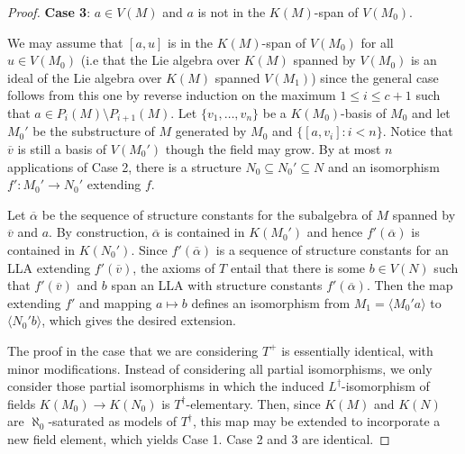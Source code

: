 \documentclass[10pt,a4paper]{amsart}
\newcommand{\set}[1]{\left\{ {#1} \right\}}
\begin{document}
\begin{proof}
\textbf{Case 3}:  $a \in V(M)$ and $a$ is not in the $K(M)$-span of $V(M_{0})$.

We may assume that $[a,u]$ is in the $K(M)$-span of $V(M_{0})$ for all $u \in V(M_{0})$ (i.e that the Lie algebra over $K(M)$ spanned by $V(M_{0})$ is an ideal of the Lie algebra over $K(M)$ spanned $V(M_{1})$) since the general case follows from this one by reverse induction on the maximum $1\leq i\leq c+1$ such that $a\in P_i(M)\setminus P_{i+1}(M)$. Let $\{v_1,\dots, v_n\}$ be a $K(M_0)$-basis of $M_0$ and let $M_{0}'$ be the substructure of $M$ generated by $M_{0}$ and $\{[a,v_{i}] : i < n\}$.  Notice that $\overline{v}$ is still a basis of $V(M_{0}')$ though the field may grow. 
 By at most $n$ applications of Case 2, there is a structure $N_{0} \subseteq N_{0}' \subseteq N$ and an isomorphism $f': M_{0}' \to N_{0}'$ extending $f$.  

 Let $\overline{\alpha}$ be the sequence of structure constants for the subalgebra of $M$ spanned by $\overline{v}$ and $a$. By construction, $\overline{\alpha}$ is contained in $K(M_{0}')$ and hence $f'(\overline{\alpha})$ is contained in $K(N_{0}')$.  Since $f'(\overline{\alpha})$ is a sequence of structure constants for an LLA extending $f'(\overline{v})$, the axioms of $T$ entail that there is some $b \in V(N)$ such that $f'(\overline{v})$ and $b$ span an LLA with structure constants $f'(\overline{\alpha})$.  Then the map extending $f'$ and mapping $a \mapsto b$ defines an isomorphism from $M_{1} = \langle M_{0}'a \rangle$ to $\langle N_{0}'b \rangle$, which gives the desired extension.  

 The proof in the case that we are considering $T^{+}$ is essentially identical, with minor modifications. %
 Instead of considering all partial isomorphisms, we only consider those partial isomorphisms in which the induced $L^\dagger$-isomorphism of fields $K(M_0)\to K(N_0)$ is $T^\dagger$-elementary.  Then, since $K(M)$ and $K(N)$ are $\aleph_{0}$-saturated as models of $T^{\dagger}$, this map may be extended to incorporate a new field element, which yields Case 1. Case 2 and 3 are identical.
\end{proof}
\end{document}
